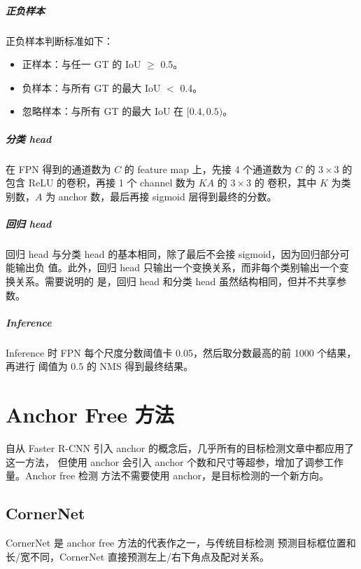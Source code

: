 \paragraph{正负样本}
正负样本判断标准如下：
\begin{itemize}
\item 正样本：与任一 GT 的 IoU $\geq$ 0.5。
\item 负样本：与所有 GT 的最大 IoU $ < $ 0.4。
\item 忽略样本：与所有 GT 的最大 IoU 在 $[0.4, 0.5)$。
\end{itemize}

\paragraph{分类 head}
在 FPN 得到的通道数为 $C$ 的 feature map 上，先接 4 个通道数为 $C$ 的
$3 \times 3$ 的包含 ReLU 的卷积，再接 1 个 channel 数为 $KA$ 的 $3 \times 3$ 的
卷积，其中 $K$ 为类别数，$A$ 为 anchor 数，最后再接 sigmoid 层得到最终的分数。

\paragraph{回归 head}
回归 head 与分类 head 的基本相同，除了最后不会接 sigmoid，因为回归部分可能输出负
值。此外，回归 head 只输出一个变换关系，而非每个类别输出一个变换关系。需要说明的
是，回归 head 和分类 head 虽然结构相同，但并不共享参数。

\paragraph{Inference}
Inference 时 FPN 每个尺度分数阈值卡 0.05，然后取分数最高的前 1000 个结果，再进行
阈值为 0.5 的 NMS 得到最终结果。

\chapter{Anchor Free 方法}
自从 Faster R-CNN 引入 anchor 的概念后，几乎所有的目标检测文章中都应用了这一方法，
但使用 anchor 会引入 anchor 个数和尺寸等超参，增加了调参工作量。Anchor free 检测
方法不需要使用 anchor，是目标检测的一个新方向。

\section{CornerNet}
\label{sec:CornerNet}
CornerNet 是 anchor free 方法的代表作之一，与传统目标检测
预测目标框位置和长/宽不同，CornerNet 直接预测左上/右下角点及配对关系。


